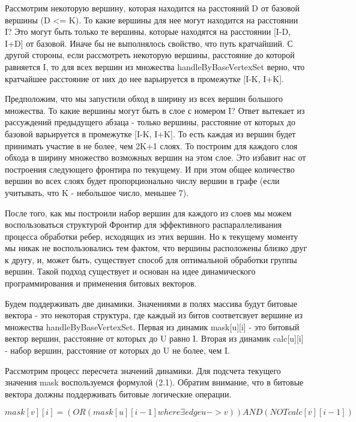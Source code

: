 Рассмотрим некоторую вершину, которая находится на расстояний D от базовой вершины (D <= K). То какие вершины для нее могут находится на расстоянии I? Это могут быть только те вершины, которые находятся на расстоянии [I-D, I+D] от базовой. Иначе бы не выполнялось свойство, что путь кратчайший. С другой стороны, если рассмотреть некоторую вершины, расстояние до которой равняется I, то для всех вершин из множества handleByBaseVertexSet верно, что кратчайшее расстояние от них до нее варьируется в промежутке [I-K, I+K]. 

 Предположим, что мы запустили обход в ширину из всех вершин большого множества. То какие вершины могут быть в слое с номером I? Ответ вытекает из рассуждений предыдущего абзаца - только вершины, расстояние от которых до базовой варьируется в промежутке [I-K, I+K]. То есть каждая из вершин будет принимать участие в не более, чем 2K+1 слоях. То построим для каждого слоя обхода в ширину множество возможных вершин на этом слое. Это избавит нас от построения следующего фронтира по текущему. И при этом общее количество вершин во всех слоях будет пропорционально числу вершин в графе (если учитывать, что K - небольшое число, меньшее 7). 
 
 После того, как мы построили набор вершин для каждого из слоев мы можем воспользоваться структурой Фронтир для эффективного распараллеливания процесса обработки ребер, исходящих из этих вершин. Но к текущему моменту мы никак не воспользовались тем фактом, что вершины расположены близко друг к другу, и, может быть, существует способ для оптимальной обработки группы вершин. Такой подход существует и основан на идее динамического программирования и применения битовых векторов. 
 
 Будем поддерживать две динамики. Значениями в полях массива будут битовые вектора - это некоторая структура, где каждый из битов соответсвует вершине из множества handleByBaseVertexSet. Первая из динамик mask[u][i] - это битовый вектор вершин, расстояние от которых до U равно I. Вторая из динамик calc[u][i] - набор вершин, расстояние от которых до U не более, чем I. 
 
 Рассмотрим процесс пересчета значений динамики. Для подсчета текущего значения mask воспользуемся формулой (2.1). Обратим внимание, что в битовые вектора должны поддерживать битовые логические операции. 
  
\begin{equation}
mask[v][i] = (OR (mask[u][i - 1] where \exists edge u->v)) AND (NOT calc[v][i - 1])
\end{equation}

